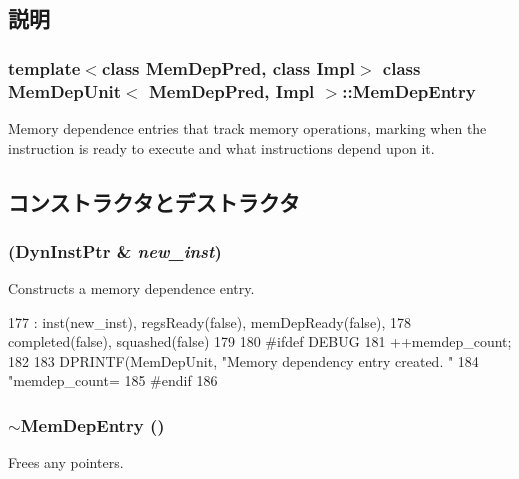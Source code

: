 \subsection{説明}
\subsubsection*{template$<$class MemDepPred, class Impl$>$ class MemDepUnit$<$ MemDepPred, Impl $>$::MemDepEntry}

Memory dependence entries that track memory operations, marking when the instruction is ready to execute and what instructions depend upon it. 

\subsection{コンストラクタとデストラクタ}
\hypertarget{classMemDepUnit_1_1MemDepEntry_ad9b3189e351f38b82275ea8605f6e3b3}{
\subsubsection[{MemDepEntry}]{ ({\bf DynInstPtr} \& {\em new\_\-inst})}}
\label{classMemDepUnit_1_1MemDepEntry_ad9b3189e351f38b82275ea8605f6e3b3}
Constructs a memory dependence entry. 


\begin{DoxyCode}
177             : inst(new_inst), regsReady(false), memDepReady(false),
178               completed(false), squashed(false)
179         {
180 #ifdef DEBUG
181             ++memdep_count;
182 
183             DPRINTF(MemDepUnit, "Memory dependency entry created.  "
184                     "memdep_count=%
185 #endif
186         }
\end{DoxyCode}
\hypertarget{classMemDepUnit_1_1MemDepEntry_a6b10def69437a251be0b0666daa22114}{
\subsubsection[{$\sim$MemDepEntry}]{\setlength{\rightskip}{0pt plus 5cm}$\sim${\bf MemDepEntry} ()}}
\label{classMemDepUnit_1_1MemDepEntry_a6b10def69437a251be0b0666daa22114}
Frees any pointers. 



